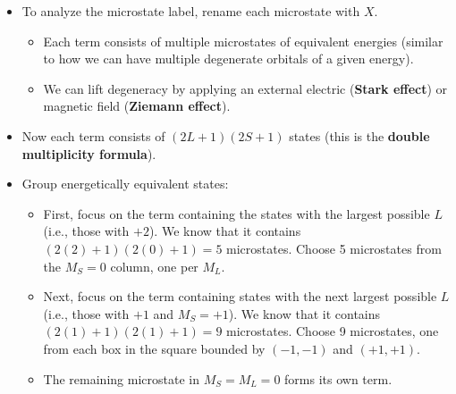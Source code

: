\documentclass[../notes.tex]{subfiles}
\begin{document}
\begin{itemize}
\begin{itemize}
\begin{table}[h!]
\begin{tabular}{c|c|c|c|c|}
                \cline{2-5}
                 & $-1$ & $-1^-0^-$ & \vertcell{$-1^+0^-$\\[-3pt]$-1^-0^+$} & $-1^+0^+$\\
                \cline{2-5}
                 & $-2$ & & $-1^+-1^-$ & \\
                \cline{2-5}
            \end{tabular}
            \caption{Microstate table for a $p^2$ electron configuration.}
            \label{tab:microstateTable-p2}
        \end{table}
        \begin{itemize}
            \item Each column represents a state with a given spin angular momentum.
            \item Each row represents the sum of the angular momentum of two electrons.
        \end{itemize}
        \item To analyze the microstate label, rename each microstate with $X$.
        \begin{itemize}
            \item Each term consists of multiple microstates of equivalent energies (similar to how we can have multiple degenerate orbitals of a given energy).
            \item We can lift degeneracy by applying an external electric (\textbf{Stark effect}) or magnetic field (\textbf{Ziemann effect}).
        \end{itemize}
        \item Now each term consists of $(2L+1)(2S+1)$ states (this is the \textbf{double multiplicity formula}).
        \item Group energetically equivalent states:
        \begin{itemize}
            \item First, focus on the term containing the states with the largest possible $L$ (i.e., those with $+2$). We know that it contains $(2(2)+1)(2(0)+1)=5$ microstates. Choose 5 microstates from the $M_S=0$ column, one per $M_L$.
            \item Next, focus on the term containing states with the next largest possible $L$ (i.e., those with $+1$ and $M_S=+1$). We know that it contains $(2(1)+1)(2(1)+1)=9$ microstates. Choose 9 microstates, one from each box in the square bounded by $(-1,-1)$ and $(+1,+1)$.
            \item The remaining microstate in $M_S=M_L=0$ forms its own term.

\end{itemize}
\end{itemize}
\end{itemize}
\end{document}
